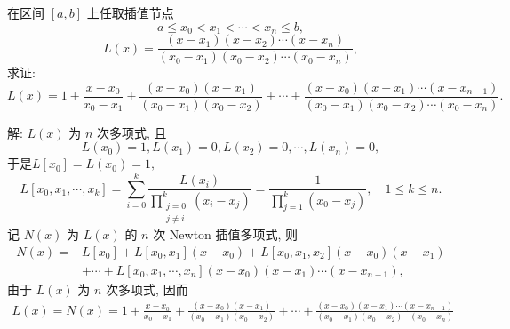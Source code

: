   \begin{tcolorbox}[enhanced,colback=10,colframe=9,breakable,coltitle=green!25!black,title=2024]
  
在区间 $ [a, b] $ 上任取插值节点
$$
a \leqslant x_{0}<x_{1}<\cdots<x_{n} \leqslant b,
$$
$$
L(x)=\frac{\left(x-x_{1}\right)\left(x-x_{2}\right) \cdots\left(x-x_{n}\right)}{\left(x_{0}-x_{1}\right)\left(x_{0}-x_{2}\right) \cdots\left(x_{0}-x_{n}\right)},
$$
求证:
$$
L(x)= 1+\frac{x-x_{0}}{x_{0}-x_{1}}+\frac{\left(x-x_{0}\right)\left(x-x_{1}\right)}{\left(x_{0}-x_{1}\right)\left(x_{0}-x_{2}\right)}+\cdots  +\frac{\left(x-x_{0}\right)\left(x-x_{1}\right) \cdots\left(x-x_{n-1}\right)}{\left(x_{0}-x_{1}\right)\left(x_{0}-x_{2}\right) \cdots\left(x_{0}-x_{n}\right)} .
$$

 \tcblower

解: $ L(x) $ 为 $ n $ 次多项式, 且
$$
L\left(x_{0}\right)=1, L\left(x_{1}\right)=0, L\left(x_{2}\right)=0, \cdots, L\left(x_{n}\right)=0,
$$
于是$L\left[x_{0}\right]=L\left(x_{0}\right)=1,$
$$
L\left[x_{0}, x_{1}, \cdots, x_{k}\right]=\sum_{i=0}^{k} \frac{L\left(x_{i}\right)}{\prod\limits_{\substack{j=0 \\ j \neq i}}^{k}\left(x_{i}-x_{j}\right)}=\frac{1}{\prod\limits_{j=1}^{k}\left(x_{0}-x_{j}\right)}, \quad 1 \leqslant k \leqslant n .
$$
记 $ N(x) $ 为 $ L(x) $ 的 $ n $ 次 Newton 插值多项式, 则
$$
\begin{aligned}
N(x)= & L\left[x_{0}\right]+L\left[x_{0}, x_{1}\right]\left(x-x_{0}\right)+L\left[x_{0}, x_{1}, x_{2}\right]\left(x-x_{0}\right)\left(x-x_{1}\right) \\
& +\cdots+L\left[x_{0}, x_{1}, \cdots, x_{n}\right]\left(x-x_{0}\right)\left(x-x_{1}\right) \cdots\left(x-x_{n-1}\right),
\end{aligned}
$$
由于 $ L(x) $ 为 $ n $ 次多项式, 因而
$$
\begin{aligned}
L(x)=  N(x) 
=  1+\frac{x-x_{0}}{x_{0}-x_{1}}+\frac{\left(x-x_{0}\right)\left(x-x_{1}\right)}{\left(x_{0}-x_{1}\right)\left(x_{0}-x_{2}\right)}  +\cdots+\frac{\left(x-x_{0}\right)\left(x-x_{1}\right) \cdots\left(x-x_{n-1}\right)}{\left(x_{0}-x_{1}\right)\left(x_{0}-x_{2}\right) \cdots\left(x_{0}-x_{n}\right)}
\end{aligned}
$$

\end{tcolorbox}


